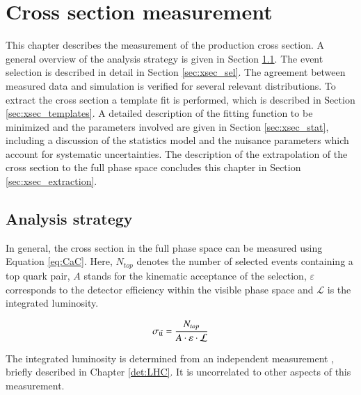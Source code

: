 \chapter{Cross section measurement}
\label{sec:xsec}

This chapter describes the measurement of the \ttbar production cross section.
A general overview of the analysis strategy is given in Section \ref{sec:xsec_strat}.
The event selection is described in detail in Section \ref{sec:xsec_sel}.
The agreement between measured data and simulation is verified for several relevant distributions.
To extract the cross section a template fit is performed, which is described in Section \ref{sec:xsec_templates}.
A detailed description of the fitting function to be minimized and the parameters involved are given in Section \ref{sec:xsec_stat},
including a discussion of the statistics model and the nuisance parameters which account for systematic uncertainties.
The description of the extrapolation of the cross section to the full phase space concludes this chapter in Section \ref{sec:xsec_extraction}.

\section{Analysis strategy}
\label{sec:xsec_strat}

In general, the cross section in the full phase space can be measured using Equation \ref{eq:CaC}. Here, $N_{top}$ denotes the number of selected events containing a top quark pair, $A$ stands for the kinematic acceptance of the selection,
$\varepsilon$ corresponds to the  detector efficiency within the visible phase space and $\mathcal{L}$ is the integrated luminosity.


\begin{equation}
\sigma_{\mathrm{t}\bar{\mathrm{t}}} = \frac{N_{top}}{A \cdot \varepsilon \cdot \mathcal{L}}
\label{eq:CaC}
\end{equation} 

The integrated luminosity is determined from an independent measurement \cite{CMS-PAS-LUM-17-001}, briefly described in Chapter  \ref{det:LHC}. It is uncorrelated to other aspects of this measurement.

